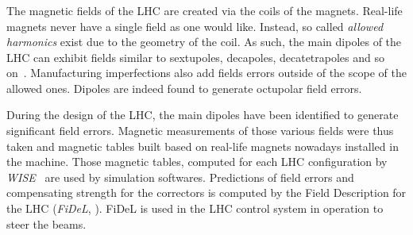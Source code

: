 \subsubsection{}

The magnetic fields of the LHC are created via the coils of the magnets. Real-life magnets never
have a single field as one would like. Instead, so called \textit{allowed harmonics} exist due to
the geometry of the coil. As such, the main dipoles of the LHC can exhibit fields similar to
sextupoles, decapoles, decatetrapoles and so on~\cite{deniau_magnetic_2009}. Manufacturing
imperfections also add fields errors outside of the scope of the allowed ones. Dipoles are indeed
found to generate octupolar field errors.

During the design of the LHC, the main dipoles have been identified to generate significant field
errors. Magnetic measurements of those various fields were thus taken and magnetic tables built
based on real-life magnets nowadays installed in the machine. Those magnetic tables, computed for
each LHC configuration by \textit{WISE}~\cite{p_hagen_wise_2006} are used by simulation softwares.
Predictions of field errors and compensating strength for the correctors is computed by the Field
Description for the LHC (\textit{FiDeL}, \cite{noauthor_fidel_2021}). FiDeL is used in the LHC
control system in operation to steer the beams.

